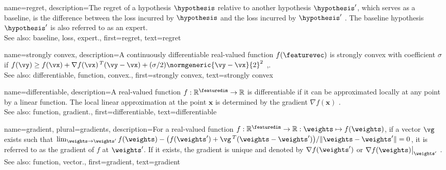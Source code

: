 {name={regret},
	description={The regret of a \gls{hypothesis} $\hypothesis$ relative to 
		another \gls{hypothesis} $\hypothesis'$, which serves as a \gls{baseline}, 
		is the difference between the \gls{loss} incurred by $\hypothesis$ and the \gls{loss} 
		incurred by $\hypothesis'$ \cite{PredictionLearningGames}. 
		The \gls{baseline} \gls{hypothesis} $\hypothesis'$ is also referred to as an \gls{expert}.
					\\ 
		See also: \gls{baseline}, \gls{loss}, \gls{expert}.},
	first={regret},
	text={regret} 
}

{name={strongly convex},
	description={A continuously \gls{differentiable} real-valued 
		\gls{function} $f(\featurevec)$ is strongly \gls{convex} with coefficient $\sigma$ if $f(\vy) \geq f(\vx) + \nabla f(\vx)\,^{T} (\vy - \vx) + (\sigma/2) \normgeneric{\vy - \vx}{2}^{2}$ \cite{nesterov04},\cite[Sec. B.1.1]{CvxAlgBertsekas}.
					\\ 
		See also: \gls{differentiable}, \gls{function}, \gls{convex}.},
	first={strongly convex},
	text={strongly convex} 
}

{name={differentiable},
	description={A real-valued \gls{function} $f: \mathbb{R}^{\featuredim} \rightarrow \mathbb{R}$ 
		is differentiable if it can be approximated locally at any point by a linear \gls{function}. 
		The local linear approximation at the point $\mathbf{x}$ is determined 
		by the \gls{gradient} $\nabla f ( \mathbf{x})$ \cite{RudinBookPrinciplesMatheAnalysis}.
					\\ 
		See also: \gls{function}, \gls{gradient}.},
	first={differentiable},
	text={differentiable} 
}

{name={gradient}, plural={gradients},
	description={For a real-valued \gls{function} 
		$f: \mathbb{R}^{\featuredim} \rightarrow \mathbb{R}: \weights \mapsto f(\weights)$, 
		if a \gls{vector} $\vg$ exists such that 
		$\lim_{\weights \rightarrow \weights'} {f(\weights) - \big(f(\weights') + \vg\,^{T} (\weights - \weights') \big) }/{\| \weights - \weights'\|}=0$, 
		it is referred to as the gradient of $f$ at $\weights'$. If it exists, the gradient is unique and 
		denoted by $\nabla f(\weights')$ or $\nabla f(\weights)\big|_{\weights'}$ \cite{RudinBookPrinciplesMatheAnalysis}.
		\\
		See also: \gls{function}, \gls{vector}.},
	first={gradient},
	text={gradient} 
}

